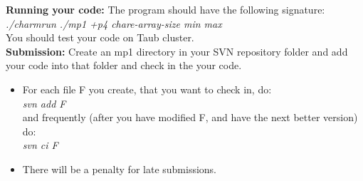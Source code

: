 \documentclass{article}
\begin{document}
\textbf{Running your code:}
The program should have the following signature:
\textit{./charmrun ./mp1 +p4 chare-array-size min max} \\
You should test your code on Taub cluster. \\

\textbf{Submission:}
Create an mp1 directory in your SVN repository folder and add your code into
that folder and check in the your code.
\begin{itemize}
\item  For each file F you create, that you want to check in, do: \\
        \textit{svn add F}\\
        and frequently (after you have modified F, and have the next better
        version) do:\\ 
        \textit{svn ci F}
\item  There will be a penalty for late submissions.
\end{itemize}
\end{document}
